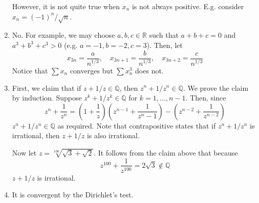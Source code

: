 \documentclass[10pt, a4paper, twoside]{report}
\begin{document}
\begin{enumerate}[{1.}]
    However, it is not quite true when \(x_n\) is not always positive. E.g. consider \(x_n=(-1)^n/\sqrt{n}\).
    \item No. For example, we may choose \(a,b,c\in\mathbb{R}\) such that \(a+b+c=0\) and \(a^3+b^3+c^3>0\) (e.g. \(a=-1,b=-2,c=3\)). Then, let 
    \[x_{3n}=\frac{a}{n^{1/3}},\quad x_{3n+1}=\frac{b}{n^{1/3}},\quad x_{3n+2}=\frac{c}{n^{1/3}}\]
    Notice that \(\sum x_n\) converges but \(\sum x_n^3\) does not.
    \item First, we claim that if \(z+1/z\in\mathbb{Q}\), then \(z^n+1/z^n\in\mathbb{Q}\). We prove the claim by induction. Suppose \(z^{k}+1/z^k\in\mathbb{Q}\) for \(k=1,\ldots,n-1\). Then, since 
    \[z^n+\frac 1{z^n}=\left(1+\frac 1z\right)\left(z^{n-1}+\frac 1{z^n-1}\right)-\left(z^{n-2}+\frac 1{z^{n-2}}\right)\]
    \(z^n+1/z^n\in\mathbb{Q}\) as required. Note that contrapositive states that if \(z^n+1/z^n\) is irrational, then \(z+1/z\) is also irrational. 
    
    Now let \(z=\sqrt[100]{\sqrt{3}+\sqrt{2}}\). It follows from the claim above that because 
    \[z^{100}+\frac 1{z^{100}}=2\sqrt{3}\notin\mathbb{Q}\]
    \(z+1/z\) is irrational.
    \item It is convergent by the Dirichlet's test.
\end{enumerate}
\end{document}

